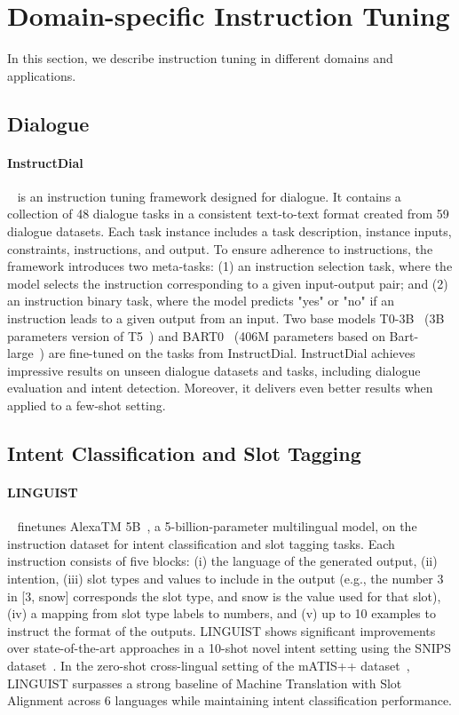 \documentclass[11pt]{article}
\begin{document}
\section{Domain-specific Instruction Tuning}
In this section, we describe instruction tuning in different domains and applications.

\label{application}
\subsection{Dialogue}
\paragraph{InstructDial}~\citep{Gupta2022InstructDialIZ} is an instruction tuning framework designed for dialogue. It contains a collection of 48 dialogue tasks in a consistent text-to-text format created from 59 dialogue datasets. Each task instance includes a task description, instance inputs, constraints, instructions, and output. To ensure adherence to instructions, the framework introduces two  meta-tasks: (1) an instruction selection task, where the model selects the instruction corresponding to a given input-output pair; 
and (2) an instruction binary task, where the model predicts "yes" or "no" if an instruction leads to a given output from an input. Two base models T0-3B~\citep{sanh2021multitask} (3B parameters version of T5~\citep{lester-etal-2021-power}) and BART0~\citep{lin2022unsupervised} (406M parameters based on Bart-large~\citep{lewis-etal-2020-bart}) are fine-tuned on the tasks from InstructDial. InstructDial achieves impressive results on unseen dialogue datasets and tasks, including dialogue evaluation and intent detection. Moreover, it delivers even better results when applied to a few-shot setting.

\subsection{Intent Classification and Slot Tagging}
\paragraph{LINGUIST}~\citep{Rosenbaum2022LINGUISTLM} finetunes AlexaTM 5B~\citep{soltan2022alexatm}, a 5-billion-parameter multilingual model, on the instruction dataset for intent classification and slot tagging tasks. Each instruction consists of five blocks: (i) the language of the generated output, (ii) intention, (iii) slot types and values to include in the output (e.g., the number 3 in [3, snow] corresponds the slot type, and snow is the value used for that slot), (iv) a mapping from slot type labels to numbers, and (v) up to 10 examples to instruct the format of the outputs.  LINGUIST  shows significant improvements over state-of-the-art approaches in a 10-shot novel intent setting using the SNIPS dataset~\citep{DBLP:journals/corr/abs-1805-10190}. In the zero-shot cross-lingual setting of the mATIS++ dataset~\citep{xu2020endtoend}, LINGUIST surpasses a strong baseline of Machine Translation with Slot Alignment across 6 languages while maintaining intent classification performance.
\end{document}
